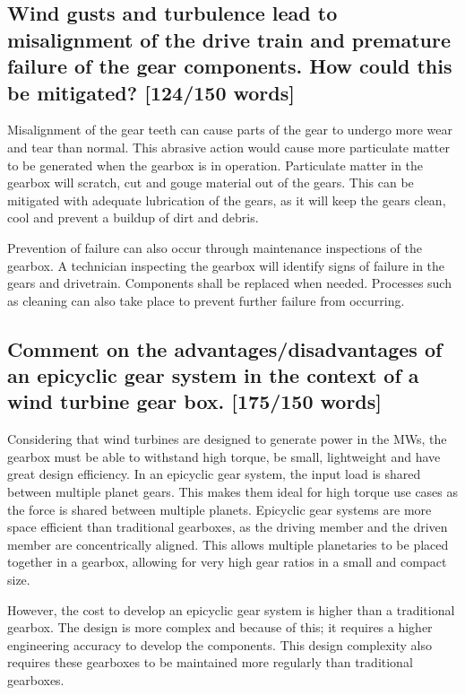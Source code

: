 \documentclass[12pt]{article}
\numberwithin{equation}{section}
\begin{document}
\begin{flushleft}
\subsection[Misalignment and failure prevention.]{Wind gusts and turbulence lead to misalignment of the drive train and premature failure of the gear components. How could this be mitigated? [124/150 words]}
Misalignment of the gear teeth can cause parts of the gear to undergo more wear and tear than normal. This abrasive action would cause more particulate matter to be generated when the gearbox is in operation. Particulate matter in the gearbox will scratch, cut and gouge material out of the gears. This can be mitigated with adequate lubrication of the gears, as it will keep the gears clean, cool and prevent a buildup of dirt and debris. 

Prevention of failure can also occur through maintenance inspections of the gearbox. A technician inspecting the gearbox will identify signs of failure in the gears and drivetrain. Components shall be replaced when needed. Processes such as cleaning can also take place to prevent further failure from occurring.

\subsection[Advantages/disadvantages of an epicyclic gearbox.]{Comment on the advantages/disadvantages of an epicyclic gear system in the context of a wind turbine gear box. [175/150 words]}
Considering that wind turbines are designed to generate power in the MWs, the gearbox must be able to withstand high torque, be small, lightweight and have great design efficiency. In an epicyclic gear system, the input load is shared between multiple planet gears. This makes them ideal for high torque use cases as the force is shared between multiple planets. Epicyclic gear systems are more space efficient than traditional gearboxes, as the driving member and the driven member are concentrically aligned. This allows multiple planetaries to be placed together in a gearbox, allowing for very high gear ratios in a small and compact size.

However, the cost to develop an epicyclic gear system is higher than a traditional gearbox. The design is more complex and because of this; it requires a higher engineering accuracy to develop the components. This design complexity also requires these gearboxes to be maintained more regularly than traditional gearboxes.


\end{flushleft}
\end{document}
